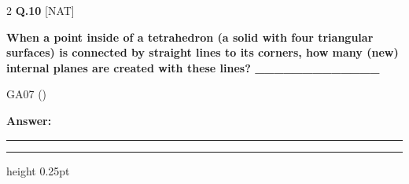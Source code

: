 \documentclass[a4paper,10pt,twoside]{article}
\begin{document}
\begin{multicols}{2}
\noindent\textbf{Q.10} \hfill {\footnotesize\textsf{[NAT]}}
\par\vspace{2pt}
{\bfseries When a point inside of a tetrahedron (a solid with four triangular surfaces) is connected by straight
lines to its corners, how many (new) internal planes are created with these lines? \_\_\_\_\_\_\_\_\_\_\_\_\_
\par\smallskip
GA07 () \par}
\par\vspace{3pt}\noindent\textbf{Answer:} \rule{3.2cm}{0.4pt}
\par\vspace{6pt}\hrule height 0.25pt\vspace{6pt}

\vspace{6pt}
\vspace{3pt}


\end{multicols}
\end{document}
